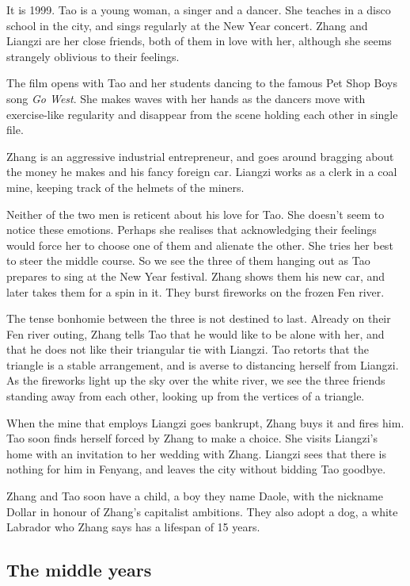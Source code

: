 \documentclass{article}
\begin{document}
It is 1999.  Tao is a young woman, a singer and a dancer.  She teaches
in a disco school in the city, and sings regularly at the New Year
concert.  Zhang and Liangzi are her close friends, both of them in
love with her, although she seems strangely oblivious to their
feelings.

The film opens with Tao and her students dancing to the famous Pet
Shop Boys song \emph{Go West}.  She makes waves with her hands as the
dancers move with exercise-like regularity and disappear from the
scene holding each other in single file.

Zhang is an aggressive industrial entrepreneur, and goes around
bragging about the money he makes and his fancy foreign car.  Liangzi
works as a clerk in a coal mine, keeping track of the helmets of the
miners.

Neither of the two men is reticent about his love for Tao.  She
doesn't seem to notice these emotions.  Perhaps she realises that
acknowledging their feelings would force her to choose one of them and
alienate the other.  She tries her best to steer the middle course.
So we see the three of them hanging out as Tao prepares to sing at the
New Year festival.  Zhang shows them his new car, and later takes them
for a spin in it.  They burst fireworks on the frozen Fen river.

The tense bonhomie between the three is not destined to last.  Already
on their Fen river outing, Zhang tells Tao that he would like to be
alone with her, and that he does not like their triangular tie with
Liangzi.  Tao retorts that the triangle is a stable arrangement, and
is averse to distancing herself from Liangzi.  As the fireworks light
up the sky over the white river, we see the three friends standing
away from each other, looking up from the vertices of a triangle.

When the mine that employs Liangzi goes bankrupt, Zhang buys it and
fires him.  Tao soon finds herself forced by Zhang to make a choice.
She visits Liangzi's home with an invitation to her wedding with
Zhang.  Liangzi sees that there is nothing for him in Fenyang, and
leaves the city without bidding Tao goodbye.

Zhang and Tao soon have a child, a boy they name Daole, with the
nickname Dollar in honour of Zhang's capitalist ambitions.  They also
adopt a dog, a white Labrador who Zhang says has a lifespan of 15
years.

\subsection{The middle years}
\label{sec:m1ubz2fo}
\end{document}
